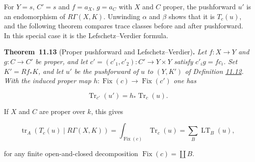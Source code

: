 \documentclass[11pt]{article}
\newenvironment{bpstatement}[2]{\par\addvspace{0.6\baselineskip}\noindent\textbf{#1}#2\textbf{.}\enspace\ignorespaces}
  {\par\addvspace{0.4\baselineskip}}
\newenvironment{bpstatementit}[2]{\begin{bpstatement}{#1}{#2}\itshape\ignorespaces}{\end{bpstatement}}
\providecommand{\Fix}{}\renewcommand{\Fix}{\operatorname{Fix}}
\begin{document}
\label{bp205}%
For \(Y=s\), \(C'=s\) and \(f=a_X\), \(g=a_C\) with \(X\) and \(C\) proper, the pushforward \(u'\) is an endomorphism of \(R\Gamma(X,K)\). Unwinding \(\alpha\) and \(\beta\) shows that it is \(T_c(u)\), and the following theorem compares trace classes before and after pushforward. In this special case it is the Lefschetz–Verdier formula.

\label{bp206}%
\begin{bpstatementit}{Theorem~11.13}{ (Proper pushforward and Lefschetz–Verdier)}
Let \(f:X\to Y\) and \(g:C\to C'\) be proper, and let \(c'=(c'_1,c'_2):C'\to Y\times Y\) satisfy \(c'_ig=fc_i\). Set \(K'=Rf_*K\), and let \(u'\) be the pushforward of \(u\) to \((Y,K')\) of Definition \hyperref[bp204]{11.12}. With the induced proper map \(h:\Fix(c)\to \Fix(c')\) one has

\[
\operatorname{Tr}_{c'}(u')=h_*\operatorname{Tr}_c(u).
\]

If \(X\) and \(C\) are proper over \(k\), this gives

\[
\operatorname{tr}_A(T_c(u)\mid R\Gamma(X,K))
=\int_{\Fix(c)}\operatorname{Tr}_c(u)
=\sum_B\operatorname{LT}_B(u),
\]

for any finite open-and-closed decomposition \(\Fix(c)=\coprod B\).
\end{bpstatementit}
\end{document}
